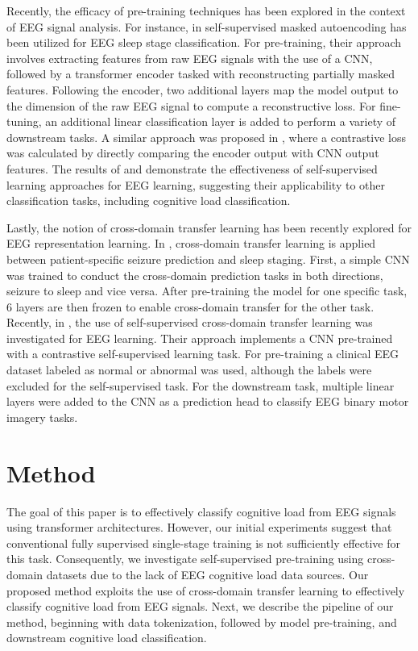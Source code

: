 \documentclass[sigconf]{acmart}
\begin{document}
Recently, the efficacy of pre-training techniques has been explored in the context of EEG signal analysis. For instance, in \cite{chien2022maeeg} self-supervised masked autoencoding has been utilized for EEG sleep stage classification. For pre-training, their approach involves extracting features from raw EEG signals with the use of a CNN, followed by a transformer encoder tasked with reconstructing partially masked features. Following the encoder, two additional layers map the model output to the dimension of the raw EEG signal to compute a reconstructive loss. For fine-tuning, an additional linear classification layer is added to perform a variety of downstream tasks. A similar approach was proposed in \cite{kostas2021bendr}, where a contrastive loss was calculated by directly comparing the encoder output with CNN output features. The results of \cite{chien2022maeeg} and \cite{kostas2021bendr} demonstrate the effectiveness of self-supervised learning approaches for EEG learning, suggesting their applicability to other classification tasks, including cognitive load classification.

Lastly, the notion of cross-domain transfer learning has been recently explored for EEG representation learning. In \cite{yang2023cross}, cross-domain transfer learning is applied between patient-specific seizure prediction and sleep staging. First, a simple CNN was trained to conduct the cross-domain prediction tasks in both directions, seizure to sleep and vice versa. After pre-training the model for one specific task, 6 layers are then frozen to enable cross-domain transfer for the other task. Recently, in \cite{li2022spp}, the use of self-supervised cross-domain transfer learning was investigated for EEG learning. Their approach implements a CNN pre-trained with a contrastive self-supervised learning task. For pre-training a clinical EEG dataset labeled as normal or abnormal was used, although the labels were excluded for the self-supervised task. For the downstream task, multiple linear layers were added to the CNN as a prediction head to classify EEG binary motor imagery tasks. 

\section{Method}\label{Method}

The goal of this paper is to effectively classify cognitive load from EEG signals using transformer architectures. However, our initial experiments suggest that conventional fully supervised single-stage training is not sufficiently effective for this task. Consequently, we investigate self-supervised pre-training using cross-domain datasets due to the lack of EEG cognitive load data sources. Our proposed method exploits the use of cross-domain transfer learning to effectively classify cognitive load from EEG signals. Next, we describe the pipeline of our method, beginning with data tokenization, followed by model pre-training, and downstream cognitive load classification.
\end{document}

